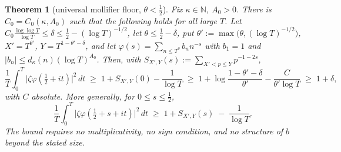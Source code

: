\documentclass[11pt]{amsart}
\theoremstyle{plain}
\newtheorem{theorem}{Theorem}[section]
\theoremstyle{definition}
\theoremstyle{remark}
\begin{document}
\begin{theorem}[universal mollifier floor, $\theta<\tfrac12$]\label{thm:floor}
Fix $\kappa\in\mathbb N$, $A_0>0$. There is $C_0=C_0(\kappa,A_0)$ such that the following holds for all large $T$. Let $C_0\frac{\log\log T}{\log T}\le\delta\le\tfrac12-(\log T)^{-1/2}$, let $\theta\le\tfrac12-\delta$, put $\theta':=\max\bigl(\theta,(\log T)^{-1/2}\bigr)$, $X'=T^{\theta'}$, $Y=T^{1-\theta'-\delta}$, and let $\varphi(s)=\sum_{n\le T^\theta}b_nn^{-s}$ with $b_1=1$ and $|b_n|\le d_\kappa(n)(\log T)^{A_0}$. Then, with $S_{X',Y}(s):=\sum_{X'<p\le Y}p^{-1-2s}$,
\[
\frac1T\int_0^T\bigl|\zeta\varphi(\tfrac12+it)\bigr|^2\,dt\;\ge\;1+S_{X',Y}(0)-\frac1{\log T}\;\ge\;1+\log\frac{1-\theta'-\delta}{\theta'}-\frac{C}{\theta'\log T}\;\ge\;1+\delta ,
\]
with $C$ absolute. More generally, for $0\le s\le\tfrac12$,
\[
\frac1T\int_0^T\bigl|\zeta\varphi(\tfrac12+s+it)\bigr|^2\,dt\;\ge\;1+S_{X',Y}(s)\;-\;\frac1{\log T}.
\]
The bound requires no multiplicativity, no sign condition, and no structure of $b$ beyond the stated size.
\end{theorem}
\end{document}
